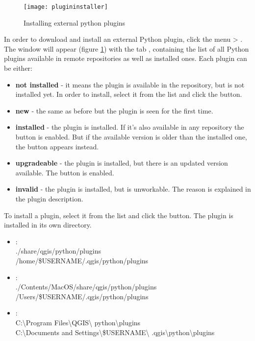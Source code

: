 \begin{figure}[ht]
   \begin{center}
   \caption{Installing external python plugins \nixcaption}
\label{fig:plugininstaller}\smallskip
   \texttt{[image: plugininstaller]}
\end{center}
\end{figure}

In order to download and install an external Python plugin, click the menu  > .
The  window will appear (figure \ref{fig:plugininstaller}) with the tab , containing the list of all Python plugins available in remote repositories as well as installed ones. Each plugin can be either:
\begin{itemize}
\item \textbf{not installed} - it means the plugin is available in the repository, but is not installed yet. In order to install, select it from the list and click the  button.
\item \textbf{new} - the same as before but the plugin is seen for the first time.
\item \textbf{installed} - the plugin is installed. If it's also available in any repository the  button is enabled. But if the available version is older than the installed one, the  button appears instead.
\item \textbf{upgradeable} - the plugin is installed, but there is an updated version available. The  button is enabled.
\item \textbf{invalid} - the plugin is installed, but is unworkable. The reason is explained in the plugin description.
\end{itemize}


To install a plugin, select it from the list and click the  button. The plugin is installed in its own directory. 

\begin{itemize}
\item {}:\\
./share/qgis/python/plugins \\
/home/\$USERNAME/.qgis/python/plugins
\item {}:\\
./Contents/MacOS/share/qgis/python/plugins \\
/Users/\$USERNAME/.qgis/python/plugins
\item {}:\\
C:\textbackslash Program Files\textbackslash QGIS\textbackslash
python\textbackslash plugins \\
C:\textbackslash Documents and Settings\textbackslash\$USERNAME\textbackslash
.qgis\textbackslash python\textbackslash plugins
\end{itemize}

